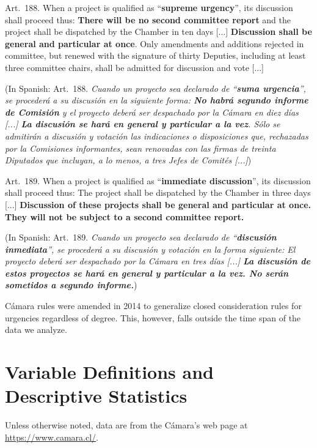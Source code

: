 \documentclass[letter,12pt]{article}
\begin{document}
\singlespacing

Art.~188. When a project is qualified as ``\textbf{supreme urgency}'', its discussion shall proceed thus: \textbf{There will be no second committee report} and the project shall be dispatched by the Chamber in ten days [...] \textbf{Discussion shall be general and particular at once}. Only amendments and additions rejected in committee, but renewed with the signature of thirty Deputies, including at least three committee chairs, shall be admitted for discussion and vote [...]

(In Spanish: Art.~188. \emph{Cuando un proyecto sea declarado de ``\textbf{suma urgencia}'', se procederá a su discusión en la siguiente forma: \textbf{No habrá segundo informe de Comisión} y el proyecto deberá ser despachado por la Cámara en diez días [...]
\textbf{La discusión se hará en general y particular a la vez}. Sólo se admitirán a discusión y votación las indicaciones o disposiciones que, rechazadas por la Comisiones informantes, sean renovadas con las firmas de treinta Diputados que incluyan, a lo menos, a tres Jefes de Comités [...]})

\bigskip

Art.~189. When a project is qualified as ``\textbf{immediate discussion}'', its discussion shall proceed thus: The project shall be dispatched by the Chamber in three days [...]
\textbf{Discussion of these projects shall be general and particular at once. They will not be subject to a second committee report.}

(In Spanish: Art.~189. \emph{Cuando un proyecto sea declarado de ``\textbf{discusión inmediata}'', se procederá a su discusión y votación en la forma siguiente:
El proyecto deberá ser despachado por la Cámara en tres días [...]
\textbf{La discusión de estos proyectos se hará en general y particular a la vez. No serán sometidos a segundo informe.}})

\doublespacing

Cámara rules were amended in 2014 to generalize closed consideration rules for urgencies regardless of degree. This, however, falls outside the time span of the data we analyze.


\section{Variable Definitions and Descriptive Statistics}

Unless otherwise noted, data are from the Cámara's web page at \url{https://www.camara.cl/}.
\end{document}
